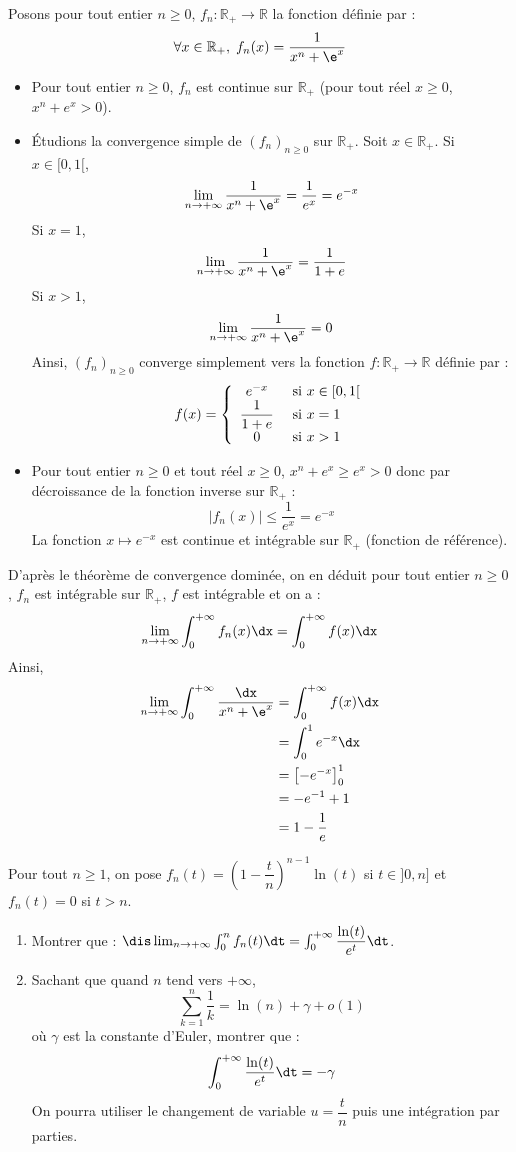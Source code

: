 \documentclass[a4paper,10pt]{report}
\begin{document}
 \corr Posons pour tout entier $n \geq 0$, $f_n : \mathbb{R}_+ \rightarrow \mathbb{R}$ la fonction définie par :
 $$ \forall x \in \mathbb{R}_+, \; f_n(x) = \frac{1}{x^{n} + \e^{x}}$$
 
 \begin{itemize}
 \item Pour tout entier $n \geq 0$, $f_n$ est continue sur $\mathbb{R}_+$ (pour tout réel $x \geq 0$, $x^n+e^x>0$).
 \item Étudions la convergence simple de $(f_n)_{n \geq 0}$ sur $\mathbb{R}_+$. Soit $x \in \mathbb{R}_+$. Si $x \in [0,1[$,
 $$ \lim_{n \rightarrow + \infty} \frac{1}{x^{n} + \e^{x}} = \dfrac{1}{e^x} = e^{-x}$$
 Si $x=1$,
 $$ \lim_{n \rightarrow + \infty} \frac{1}{x^{n} + \e^{x}} = \dfrac{1}{1+e}$$
 Si $x>1$,
 $$  \lim_{n \rightarrow + \infty} \frac{1}{x^{n} + \e^{x}} = 0$$
 Ainsi, $(f_n)_{n \geq 0}$ converge simplement vers la fonction $f: \mathbb{R}_+ \rightarrow \mathbb{R}$ définie par :
 $$ f(x) = \left\lbrace \begin{array}{cl}
 e^{-x} & \hbox{ si } x \in [0,1[ \\
  \dfrac{1}{1+e} & \hbox{ si } x = 1 \\
  0 & \hbox{ si } x>1
 \end{array}\right.$$
 \item Pour tout entier $n \geq 0$ et tout réel $x \geq 0$, $x^n+e^x \geq e^x>0$ donc par décroissance de la fonction inverse sur $\mathbb{R}_+$ :
 $$ \vert f_n(x) \vert \leq \dfrac{1}{e^x}=e^{-x}$$
La fonction $x \mapsto e^{-x}$ est continue et intégrable sur $\mathbb{R}_+$ (fonction de référence).
 \end{itemize}
D'après le théorème de convergence dominée, on en déduit pour tout entier $n \geq 0$, $f_n$ est intégrable sur $\mathbb{R}_+$, $f$ est intégrable et on a :
$$ \lim_{n \rightarrow + \infty} \int_0^{+ \infty} f_n(x) \dx = \int_0^{+ \infty} f(x) \dx$$
Ainsi,
\begin{align*}
\lim_{n \rightarrow + \infty} \int_{0}^{ + \infty} \frac{\dx}{x^{n} + \e^{x}} & = \int_0^{+ \infty} f(x) \dx \\
& = \int_0^1 e^{-x} \dx \\
& = \left[ -e^{-x} \right]_0^1 \\
& = -e^{-1}+ 1 \\
& = 1 - \dfrac{1}{e}
\end{align*}

\begin{Exa}
Pour tout $n \geq 1$, on pose $f_n(t) = \left( 1 - \dfrac{t}{n} \right)^{n-1}\ln(t)$ si $t \in ]0,n]$ et $f_n(t)=0$ si $t>n$.
\begin{enumerate}
\item Montrer que : $\dis \lim_{n \rightarrow + \infty} \int_{0}^n f_n(t) \dt = \int_{0}^{+ \infty} \dfrac{\ln(t)}{e^t} \dt$.
\item Sachant que quand $n$ tend vers $+ \infty$,
$$ \sum_{k=1}^n \dfrac{1}{k} = \ln(n)+ \gamma + o(1)$$
où $\gamma$ est la constante d'Euler, montrer que :
$$ \int_{0}^{+ \infty} \dfrac{\ln(t)}{e^t} \dt = - \gamma$$
On pourra utiliser le changement de variable $u=\dfrac{t}{n}$ puis une intégration par parties.
\end{enumerate}
\end{Exa}
\end{document}
